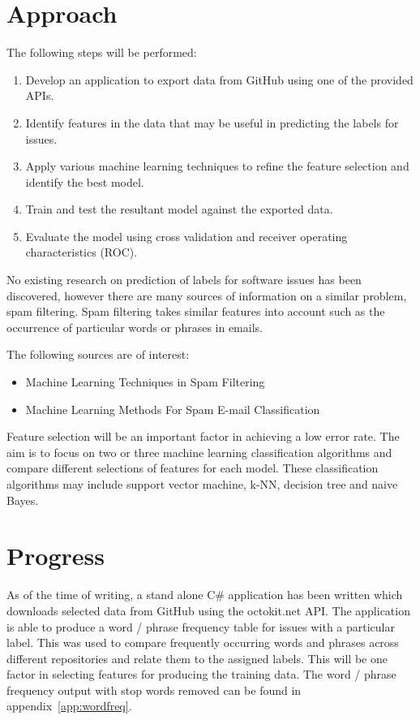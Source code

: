 \documentclass{article}
\begin{document}
\begin{multicols}{2}
\section*{Approach}
The following steps will be performed:
\begin{enumerate}
\item Develop an application to export data from GitHub using one of the provided APIs.
\item Identify features in the data that may be useful in predicting the labels for issues.
\item Apply various machine learning techniques to refine the feature selection and identify the best model.
\item Train and test the resultant model against the exported data.
\item Evaluate the model using cross validation and receiver operating characteristics (ROC).
\end{enumerate}

No existing research on prediction of labels for software issues has been discovered, however there are many sources of information on a similar problem, spam filtering. Spam filtering takes similar features into account such as the occurrence of particular words or phrases in emails.

The following sources are of interest:
\begin{itemize}
\item Machine Learning Techniques in Spam Filtering 
\item Machine Learning Methods For Spam E-mail Classification 
\end{itemize}

Feature selection will be an important factor in achieving a low error rate. The aim is to focus on two or three machine learning classification algorithms and compare different selections of features for each model. These classification algorithms may include support vector machine, k-NN, decision tree and naive Bayes.

\section*{Progress}
As of the time of writing, a stand alone C\# application has been written which downloads selected data from GitHub using the octokit.net API. The application is able to produce a word / phrase frequency table for issues with a particular label. This was used to compare frequently occurring words and phrases across different repositories and relate them to the assigned labels. This will be one factor in selecting features for producing the training data. The word / phrase frequency output with stop words removed can be found in appendix~\ref{app:wordfreq}.

\printbibliography

\end{multicols}
\end{document}
